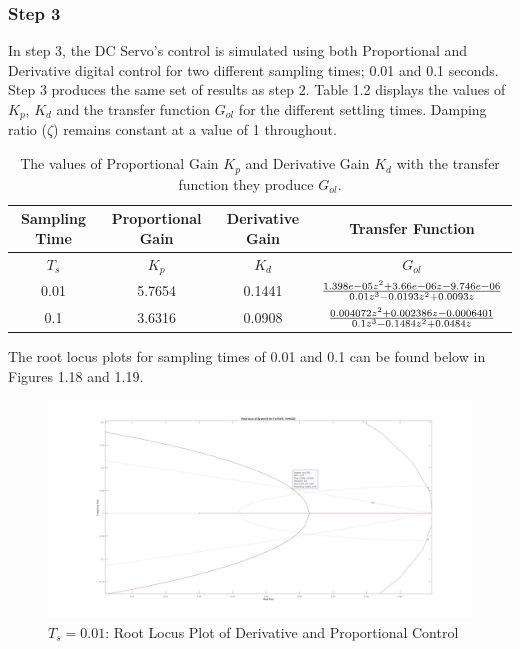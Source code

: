 \documentclass[stu, a4paper, 12pt, floatsintext]{apa7}
\numberwithin{figure}{section}
\numberwithin{table}{section}
\numberwithin{equation}{section}
\begin{document}
\subsubsection{Step 3}
In step 3, the DC Servo's control is simulated using both Proportional and Derivative digital control for two different sampling times; 0.01 and 0.1 seconds. Step 3 produces the same set of results as step 2. Table 1.2 displays the values of $K_p$, $K_d$ and the transfer function $G_{ol}$ for the different settling times. Damping ratio ($\zeta$) remains constant at a value of 1 throughout. 
\begin{table}[]
    \centering
    \caption{The values of Proportional Gain $K_p$ and Derivative Gain $K_d$ with the transfer function they produce $G_{ol}$. }
    \label{tab:task2_gain_table}
    \begin{tabular}{@{}cccc@{}}
    \toprule
    \textbf{Sampling Time} & \textbf{Proportional Gain} & \textbf{Derivative Gain} & \textbf{Transfer Function}                                                          \\ \midrule
    \textbf{$T_s$}         & $K_p$                      & $K_d$                    & $G_{ol}$                                                                            \\
    0.01                   & 5.7654                     & 0.1441                   & ${{1.398e-05 z^2 + 3.66e-06 z - 9.746e-06}\over{0.01 z^3 - 0.0193 z^2 + 0.0093 z}}$ \\
    0.1                    & 3.6316                     & 0.0908                   & ${{0.004072 z^2 + 0.002386 z - 0.0006401}\over{0.1 z^3 - 0.1484 z^2 + 0.0484 z}}$  
    \end{tabular}
\end{table}
The root locus plots for sampling times of 0.01 and 0.1 can be found below in Figures 1.18 and 1.19.
\begin{figure}[H]
    \caption{$T_s = 0.01$: Root Locus Plot of Derivative and Proportional Control}
    \label{fig:0.01_Ts_step3_root_locus}
    \centering
    \includegraphics[width=1.1\textwidth]{pictures/task3_0.01.jpg}
\end{figure}
\end{document}
